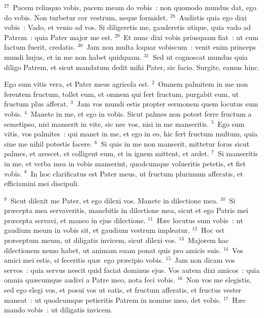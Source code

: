 ${}^{27}$~Pacem relinquo vobis, pacem meam do vobis~: non quomodo mundus dat, ego do vobis. Non turbetur cor vestrum, neque formidet.
${}^{28}$~Audistis quia ego dixi vobis~: Vado, et venio ad vos. Si diligeretis me, gauderetis utique, quia vado ad Patrem~: quia Pater major me est.
${}^{29}$~Et nunc dixi vobis priusquam fiat~: ut cum factum fuerit, credatis.
${}^{30}$~Jam non multa loquar vobiscum~: venit enim princeps mundi hujus, et in me non habet quidquam.
${}^{31}$~Sed ut cognoscat mundus quia diligo Patrem, et sicut mandatum dedit mihi Pater, sic facio. Surgite, eamus hinc.

\lettrine[lines=3,image=true,loversize=0.05,lraise=-0.03]{E}{}go sum vitis vera, et Pater meus agricola est.
${}^{2}$~Omnem palmitem in me non ferentem fructum, tollet eum, et omnem qui fert fructum, purgabit eum, ut fructum plus afferat.
${}^{3}$~Jam vos mundi estis propter sermonem quem locutus sum vobis.
${}^{4}$~Manete in me, et ego in vobis. Sicut palmes non potest ferre fructum a semetipso, nisi manserit in vite, sic nec vos, nisi in me manseritis.
${}^{5}$~Ego sum vitis, vos palmites~: qui manet in me, et ego in eo, hic fert fructum multum, quia sine me nihil potestis facere.
${}^{6}$~Si quis in me non manserit, mittetur foras sicut palmes, et arescet, et colligent eum, et in ignem mittent, et ardet.
${}^{7}$~Si manseritis in me, et verba mea in vobis manserint, quodcumque volueritis petetis, et fiet vobis.
${}^{8}$~In hoc clarificatus est Pater meus, ut fructum plurimum afferatis, et efficiamini mei discipuli.


${}^{9}$~Sicut dilexit me Pater, et ego dilexi vos. Manete in dilectione mea.
${}^{10}$~Si pr\ae cepta mea servaveritis, manebitis in dilectione mea, sicut et ego Patris mei pr\ae cepta servavi, et maneo in ejus dilectione.
${}^{11}$~H\ae c locutus sum vobis~: ut gaudium meum in vobis sit, et gaudium vestrum impleatur.
${}^{12}$~Hoc est pr\ae ceptum meum, ut diligatis invicem, sicut dilexi vos.
${}^{13}$~Majorem hac dilectionem nemo habet, ut animam suam ponat quis pro amicis suis.
${}^{14}$~Vos amici mei estis, si feceritis qu\ae\ ego pr\ae cipio vobis.
${}^{15}$~Jam non dicam vos servos~: quia servus nescit quid faciat dominus ejus. Vos autem dixi amicos~: quia omnia qu\ae cumque audivi a Patre meo, nota feci vobis.
${}^{16}$~Non vos me elegistis, sed ego elegi vos, et posui vos ut eatis, et fructum afferatis, et fructus vester maneat~: ut quodcumque petieritis Patrem in nomine meo, det vobis.
${}^{17}$~H\ae c mando vobis~: ut diligatis invicem.


